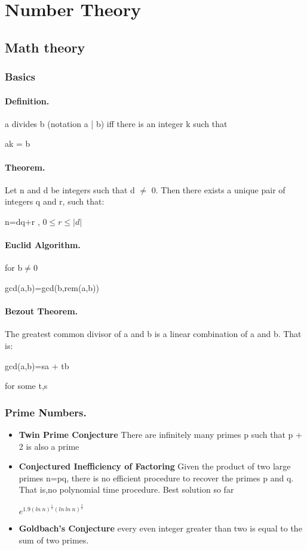 \documentclass[10pt]{article}
\begin{document}
	\section{Number Theory}{
		\subsection{Math theory}{
			\subsubsection{Basics}{
				\paragraph{Definition. }
					a divides b (notation a | b) iff there is an integer k such that
					\begin{center}ak = b\end{center}
				}
				\paragraph{Theorem. }Let n and d be integers such that d $ \neq $ 0.
				Then there exists a unique pair of integers q and r, such that:
				\begin{center}\large n=dq+r , $ 0\leq r \leq |d|$\end{center}
				\paragraph{Euclid Algorithm. }{for b$ \neq $0 
					\begin{center}
					\large	gcd(a,b)=gcd(b,rem(a,b))
					\end{center}
				}
				\paragraph{Bezout Theorem. }{The greatest common divisor of a and b is a linear combination
					of a and b. That is:
					\begin{center}
						\large gcd(a,b)=sa + tb
					\end{center}
					for some t,s}
			}
			\subsubsection{Prime Numbers. }{
				\begin{itemize}
					\item\textbf{Twin Prime Conjecture} There are infinitely many primes p such that p + 2 is also a prime
					\item\textbf{Conjectured Inefficiency of Factoring} Given the product of two large primes n=pq, there is no efficient procedure to recover the primes p and q. That is,no polynomial time procedure. Best solution so far 
					\begin{center}\large$ e^{1.9(ln\ n)^\frac{1}{3}(ln\ ln\ n)^\frac{2}{3}} $\end{center}
					\item\textbf{Goldbach’s Conjecture} every even integer greater than two is equal to the sum of two primes.
				\end{itemize}
}}
\end{document}
